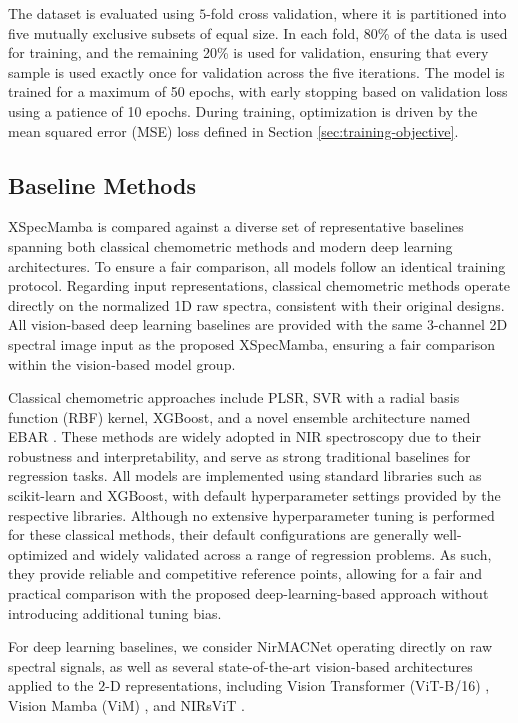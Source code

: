 \documentclass[pdflatex,sn-mathphys-num]{sn-jnl}%
\begin{document}
The dataset is evaluated using $5$-fold cross validation, where it is partitioned into five mutually exclusive subsets of equal size. In each fold, 80\% of the data is used for training, and the remaining 20\% is used for validation, ensuring that every sample is used exactly once for validation across the five iterations. The model is trained for a maximum of 50 epochs, with early stopping based on validation loss using a patience of 10 epochs. During training, optimization is driven by the mean squared error (MSE) loss defined in Section \ref{sec:training-objective}. 

\subsection{Baseline Methods}
XSpecMamba is compared against a diverse set of representative baselines spanning both classical chemometric methods and modern deep learning architectures. To ensure a fair comparison, all models follow an identical training protocol. Regarding input representations, classical chemometric methods operate directly on the normalized 1D raw spectra, consistent with their original designs. All vision-based deep learning baselines are provided with the same 3-channel 2D spectral image input as the proposed XSpecMamba, ensuring a fair comparison within the vision-based model group.

Classical chemometric approaches include PLSR, SVR with a radial basis function (RBF) kernel, XGBoost, and a novel ensemble architecture named EBAR \cite{phan2025ebar}. These methods are widely adopted in NIR spectroscopy due to their robustness and interpretability, and serve as strong traditional baselines for regression tasks. All models are implemented using standard libraries such as scikit-learn and XGBoost, with default hyperparameter settings provided by the respective libraries. Although no extensive hyperparameter tuning is performed for these classical methods, their default configurations are generally well-optimized and widely validated across a range of regression problems. As such, they provide reliable and competitive reference points, allowing for a fair and practical comparison with the proposed deep-learning-based approach without introducing additional tuning bias.

For deep learning baselines, we consider NirMACNet \cite{phuong2025nirmacnet} operating directly on raw spectral signals, as well as several state-of-the-art vision-based architectures applied to the $2$-D representations, including Vision Transformer (ViT-B/16) \cite{dosovitskiy2021image}, Vision Mamba (ViM) \cite{zhu2024vision}, and NIRsViT \cite{van2024nirsvit}.
\end{document}
